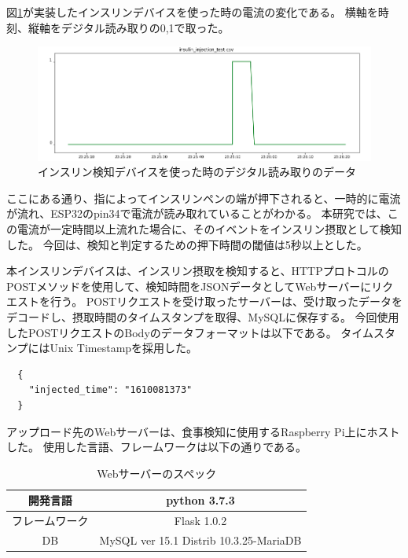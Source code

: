 図\ref{fig:insulin_injection_test}が実装したインスリンデバイスを使った時の電流の変化である。
横軸を時刻、縦軸をデジタル読み取りの0,1で取った。

\begin{figure}[htbp]
  \caption{インスリン検知デバイスを使った時のデジタル読み取りのデータ}
  \label{fig:insulin_injection_test}
  \begin{center}
    \includegraphics[bb=0 0 1000 350,width=17cm]{assets/insulin_injection_test.png}
  \end{center}
\end{figure}

ここにある通り、指によってインスリンペンの端が押下されると、一時的に電流が流れ、ESP32のpin34で電流が読み取れていることがわかる。
本研究では、この電流が一定時間以上流れた場合に、そのイベントをインスリン摂取として検知した。
今回は、検知と判定するための押下時間の閾値は5秒以上とした。\cite{how_to_inject_insulin_1} \cite{how_to_inject_insulin_2}

本インスリンデバイスは、インスリン摂取を検知すると、HTTPプロトコルのPOSTメソッドを使用して、検知時間をJSONデータとしてWebサーバーにリクエストを行う。
POSTリクエストを受け取ったサーバーは、受け取ったデータをデコードし、摂取時間のタイムスタンプを取得、MySQLに保存する。
今回使用したPOSTリクエストのBodyのデータフォーマットは以下である。
タイムスタンプにはUnix Timestampを採用した。

\begin{verbatim}
  {
    "injected_time": "1610081373"
  }
\end{verbatim}

アップロード先のWebサーバーは、食事検知に使用するRaspberry Pi上にホストした。
使用した言語、フレームワークは以下の通りである。

\begin{table}[htbp]
  \caption{Webサーバーのスペック}
  \label{tb:web_server}
  \begin{center}
    \begin{tabular}{|c||c|}
      \hline
      開発言語  & python 3.7.3 \\\hline
      フレームワーク  & Flask 1.0.2 \\\hline
      DB & MySQL ver 15.1 Distrib 10.3.25-MariaDB \\\hline
    \end{tabular}
  \end{center}
\end{table}

